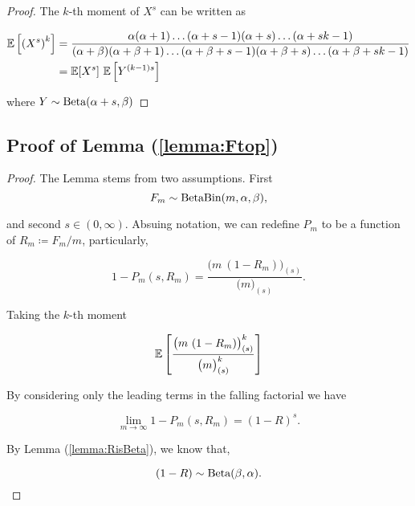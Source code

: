 \documentclass[../../main.tex]{subfiles}
\begin{document}
\begin{proof}
    The $k$-th moment of $X^s$ can be written as

    \begin{equation}
        \begin{split}
            \mathbb{E}\left[\left(X^s\right)^k\right] &= \frac{\alpha (\alpha + 1) \ldots (\alpha + s - 1) (\alpha + s) \ldots (\alpha + s k - 1) }{(\alpha + \beta) (\alpha + \beta + 1) \ldots (\alpha + \beta + s - 1) (\alpha + \beta + s) \ldots (\alpha + \beta + s k - 1) } \\
            &= \mathbb{E}[X^s] \ \mathbb{E}\left[Y^{(k - 1)s }\right]
        \end{split}
    \end{equation}

    where $Y \sim \text{Beta}(\alpha + s, \beta)$

\end{proof}



\subsection[From distribution to probability]{Proof of Lemma (\ref{lemma:Ftop})}


\begin{proof}
    The Lemma stems from two assumptions. First
    \begin{equation}
        F_m \sim \text{Beta}\text{Bin}(m, \alpha, \beta),
    \end{equation}

    and second $s \in (0, \infty)$. Absuing notation, we can redefine $P_m$ to be a function of $R_m \coloneqq F_m / m$, particularly,
    
    \begin{equation}
        1 - P_m(s, R_m) = \frac{\big(m \ (1 - R_m)\big)_{(s)}}{\big( m \big)_{(s)}}.
    \end{equation}

    Taking the $k$-th moment

    \begin{equation}
        \mathbb{E}\left[ \frac{\big(m \ (1 - R_m)\big)^k_{(s)}}{\big( m \big)^k_{(s)}}\right]
    \end{equation}

    By considering only the leading terms in the falling factorial we have

    \begin{equation}
        \lim_{m \rightarrow \infty} 1 - P_m(s, R_m) = (1 - R)^s.
    \end{equation}

    By Lemma (\ref{lemma:RisBeta}), we know that,

    \begin{equation}
        (1 - R) \sim \text{Beta}(\beta, \alpha).
    \end{equation}

\end{proof}
\end{document}
